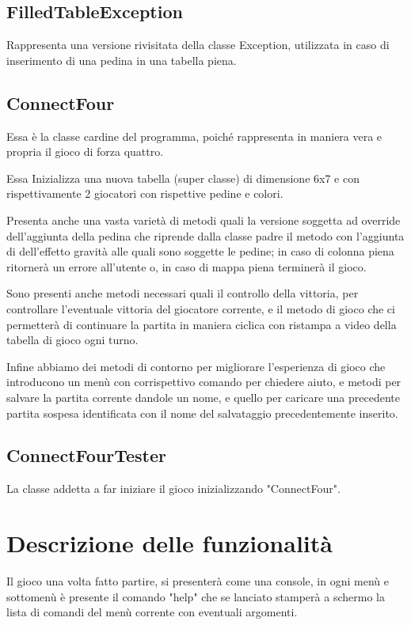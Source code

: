 \documentclass{article}
\begin{document}
\subsection{FilledTableException}
Rappresenta una versione rivisitata della classe Exception, utilizzata in caso di inserimento di una pedina in una tabella piena.


\subsection{ConnectFour}
Essa è la classe cardine del programma, poiché rappresenta in maniera vera e propria il gioco di forza quattro.

Essa Inizializza una nuova tabella (super classe) di dimensione 6x7 e con rispettivamente 2 giocatori con rispettive pedine e colori.

Presenta anche una vasta varietà di metodi quali la versione soggetta ad override dell'aggiunta della pedina che riprende dalla classe padre il metodo con l'aggiunta di dell'effetto gravità alle quali sono soggette le pedine; in caso di colonna piena ritornerà un errore all'utente o, in caso di mappa piena terminerà il gioco.

Sono presenti anche metodi necessari quali il controllo della vittoria, per controllare l'eventuale vittoria del giocatore corrente, e il metodo di gioco che ci permetterà di continuare la partita in maniera ciclica con ristampa a video della tabella di gioco ogni turno.

Infine abbiamo dei metodi di contorno per migliorare l'esperienza di gioco che introducono un menù con corrispettivo comando per chiedere aiuto, e metodi per salvare la partita corrente dandole un nome, e quello per caricare una precedente partita sospesa identificata con il nome del salvataggio precedentemente inserito.


\subsection{ConnectFourTester}
La classe addetta a far iniziare il gioco inizializzando "ConnectFour".


\section{Descrizione delle funzionalità}
Il gioco una volta fatto partire, si presenterà come una console, in ogni menù e sottomenù è presente il comando "help" che se lanciato stamperà a schermo la lista di comandi del menù corrente con eventuali argomenti.
\end{document}
